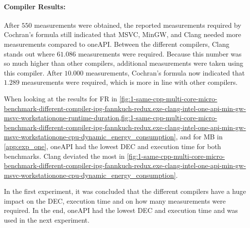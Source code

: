 
% 

\paragraph{Compiler Results:} After $550$ measurements were obtained, the reported measurements required by Cochran's formula still indicated that MSVC, MinGW, and Clang needed more measurements compared to oneAPI. Between the different compilers, Clang stands out where $61.086$ measurements were required. Because this number was so much higher than other compilers, additional measurements were taken using this compiler. After $10.000$ measurements, Cochran's formula now indicated that $1.289$ measurements were required, which is more in line with other compilers.


When looking at the results for FR in \cref{fig:1-same-cpp-multi-core-micro-benchmark-different-compiler-ipg-fannkuch-redux.exe-clang-intel-one-api-min-gw-msvc-workstationone-runtime-duration,fig:1-same-cpp-multi-core-micro-benchmark-different-compiler-ipg-fannkuch-redux.exe-clang-intel-one-api-min-gw-msvc-workstationone-cpu-dynamic_energy_consumption}, and for MB in \cref{app:exp_one}, oneAPI had the lowest DEC and execution time for both benchmarks. Clang deviated the most in \cref{fig:1-same-cpp-multi-core-micro-benchmark-different-compiler-ipg-fannkuch-redux.exe-clang-intel-one-api-min-gw-msvc-workstationone-cpu-dynamic_energy_consumption}.

In the first experiment, it was concluded that the different compilers have a huge impact on the DEC, execution time and on how many measurements were required. In the end, oneAPI had the lowest DEC and execution time and was used in the next experiment.


